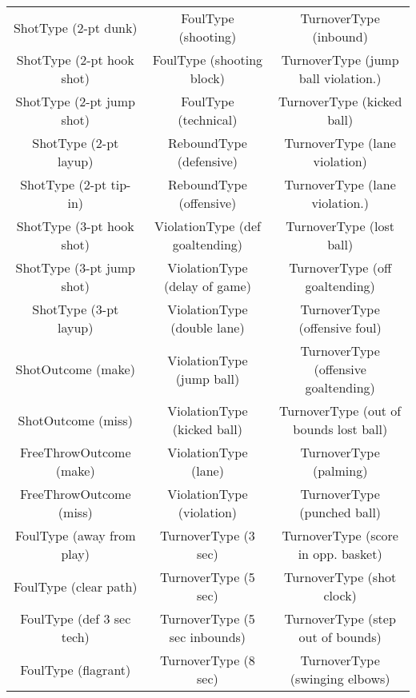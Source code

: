 \FloatBarrier

\begin{table}
	\ttfamily \footnotesize
	\begin{tabular}{ccc}
		ShotType (2-pt dunk)        & FoulType (shooting)                 & TurnoverType (inbound)                 \\
		ShotType (2-pt hook shot)   & FoulType (shooting block)           & TurnoverType (jump ball violation.)    \\
		ShotType (2-pt jump shot)   & FoulType (technical)                & TurnoverType (kicked ball)             \\
		ShotType (2-pt layup)       & ReboundType (defensive)             & TurnoverType (lane violation)          \\
		ShotType (2-pt tip-in)      & ReboundType (offensive)             & TurnoverType (lane violation.)         \\
		ShotType (3-pt hook shot)   & ViolationType (def goaltending)     & TurnoverType (lost ball)               \\
		ShotType (3-pt jump shot)   & ViolationType (delay of game)       & TurnoverType (off goaltending)         \\
		ShotType (3-pt layup)       & ViolationType (double lane)         & TurnoverType (offensive foul)          \\
		ShotOutcome (make)          & ViolationType (jump ball)           & TurnoverType (offensive goaltending)   \\
		ShotOutcome (miss)          & ViolationType (kicked ball)         & TurnoverType (out of bounds lost ball) \\
		FreeThrowOutcome (make)     & ViolationType (lane)                & TurnoverType (palming)                 \\
		FreeThrowOutcome (miss)     & ViolationType (violation)           & TurnoverType (punched ball)            \\
		FoulType (away from play)   & TurnoverType (3 sec)                & TurnoverType (score in opp. basket)    \\
		FoulType (clear path)       & TurnoverType (5 sec)                & TurnoverType (shot clock)              \\
		FoulType (def 3 sec tech)   & TurnoverType (5 sec inbounds)       & TurnoverType (step out of bounds)      \\
		FoulType (flagrant)         & TurnoverType (8 sec)                & TurnoverType (swinging elbows)         \\

\end{tabular}
\end{table}
